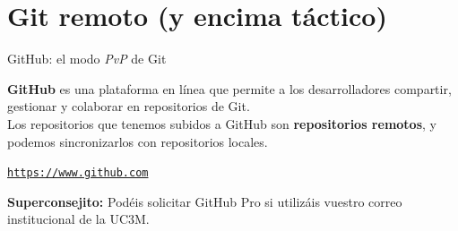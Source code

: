 \documentclass[11pt]{beamer}
\begin{document}

\section{Git remoto (y encima táctico)}

\begin{frame}{GitHub: el modo \textit{PvP} de Git}
	
	\textbf{GitHub} es una plataforma en línea que permite a los desarrolladores compartir, gestionar y colaborar en repositorios de Git.\\
    Los repositorios que tenemos subidos a GitHub son \textbf{repositorios remotos}, y podemos sincronizarlos con repositorios locales.
 
	\smallskip 

    \begin{block}{}
        \href{https://www.github.com}{\texttt{https://www.github.com}}
    \end{block}

    \smallskip
	
	\footnotesize \textbf{Superconsejito:} Podéis solicitar GitHub Pro si utilizáis vuestro correo institucional de la UC3M.
\end{frame}

\end{document}
